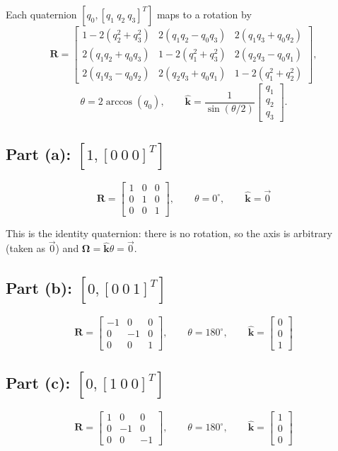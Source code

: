 \documentclass[11pt]{article}
\newcommand{\R}{\bm{R}}
\newcommand{\khat}{\widehat{\bm{k}}}
\begin{document}
Each quaternion $[q_{0},[q_{1}\ q_{2}\ q_{3}]^{T}]$ maps to a rotation by
\[
    \R = \begin{bmatrix}
        1-2(q_{2}^{2}+q_{3}^{2}) & 2(q_{1}q_{2}-q_{0}q_{3}) & 2(q_{1}q_{3}+q_{0}q_{2})\\
        2(q_{1}q_{2}+q_{0}q_{3}) & 1-2(q_{1}^{2}+q_{3}^{2}) & 2(q_{2}q_{3}-q_{0}q_{1})\\
        2(q_{1}q_{3}-q_{0}q_{2}) & 2(q_{2}q_{3}+q_{0}q_{1}) & 1-2(q_{1}^{2}+q_{2}^{2})
    \end{bmatrix},
\]
\[
    \theta = 2\arccos(q_{0}), \qquad
    \khat = \frac{1}{\sin(\theta/2)}\begin{bmatrix}q_{1}\\ q_{2}\\ q_{3}\end{bmatrix}.
\]

\subsection*{Part (a): $[1,[0\ 0\ 0]^{T}]$}
\begin{result}
\[
    \R = \begin{bmatrix}1 & 0 & 0\\ 0 & 1 & 0\\ 0 & 0 & 1\end{bmatrix}, \qquad
    \theta = 0^\circ, \qquad \khat = \vec 0
\]
\end{result}
This is the identity quaternion: there is no rotation, so the axis is arbitrary (taken as $\vec 0$) and $\bm\Omega = \khat\theta = \vec 0$.

\subsection*{Part (b): $[0,[0\ 0\ 1]^{T}]$}
\begin{result}
\[
    \R = \begin{bmatrix}-1 & 0 & 0\\ 0 & -1 & 0\\ 0 & 0 & 1\end{bmatrix}, \qquad
    \theta = 180^\circ, \qquad \khat = \begin{bmatrix}0\\ 0\\ 1\end{bmatrix}
\]
\end{result}

\subsection*{Part (c): $[0,[1\ 0\ 0]^{T}]$}
\begin{result}
\[
    \R = \begin{bmatrix}1 & 0 & 0\\ 0 & -1 & 0\\ 0 & 0 & -1\end{bmatrix}, \qquad
    \theta = 180^\circ, \qquad \khat = \begin{bmatrix}1\\ 0\\ 0\end{bmatrix}
\]
\end{result}
\end{document}
